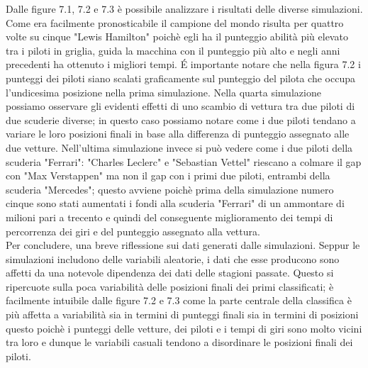 Dalle figure 7.1, 7.2 e 7.3 è possibile analizzare i risultati delle diverse simulazioni. Come era facilmente pronosticabile il campione del mondo risulta per quattro volte su cinque "Lewis Hamilton" poichè egli ha il punteggio abilità più elevato tra i piloti in griglia, guida la macchina con il punteggio più alto e negli anni precedenti ha ottenuto i migliori tempi. É importante notare che nella figura 7.2 i punteggi dei piloti siano scalati graficamente sul punteggio del pilota che occupa l'undicesima posizione nella prima simulazione. Nella quarta simulazione possiamo osservare gli evidenti effetti di uno scambio di vettura tra due piloti di due scuderie diverse; in questo caso possiamo notare come i due piloti tendano a variare le loro posizioni finali in base alla differenza di punteggio assegnato alle due vetture. Nell'ultima simulazione invece si può vedere come i due piloti della scuderia "Ferrari": "Charles Leclerc" e "Sebastian Vettel" riescano a colmare il gap con "Max Verstappen" ma non il gap con i primi due piloti, entrambi della scuderia "Mercedes"; questo avviene poichè prima della simulazione numero cinque sono stati aumentati i fondi alla scuderia "Ferrari" di un ammontare di milioni pari a trecento e quindi del conseguente miglioramento dei tempi di percorrenza dei giri e del punteggio assegnato alla vettura.\\
Per concludere, una breve riflessione sui dati generati dalle simulazioni. Seppur le simulazioni includono delle variabili aleatorie, i dati che esse producono sono affetti da una notevole dipendenza dei dati delle stagioni passate. Questo si ripercuote sulla poca variabilità delle posizioni finali dei primi classificati; è facilmente intuibile dalle figure 7.2 e 7.3 come la parte centrale della classifica è più affetta a variabilità sia in termini di punteggi finali sia in termini di posizioni questo poichè i punteggi delle vetture, dei piloti e i tempi di giri sono molto vicini tra loro e dunque le variabili casuali tendono a disordinare le posizioni finali dei piloti.